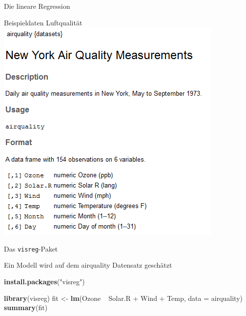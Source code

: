 \documentclass[ignorenonframetext,]{beamer}
\newenvironment{Shaded}{}{}
\newcommand{\KeywordTok}[1]{\textcolor[rgb]{0.00,0.44,0.13}{\textbf{{#1}}}}
\newcommand{\DataTypeTok}[1]{\textcolor[rgb]{0.56,0.13,0.00}{{#1}}}
\newcommand{\StringTok}[1]{\textcolor[rgb]{0.25,0.44,0.63}{{#1}}}
\newcommand{\NormalTok}[1]{{#1}}
\begin{document}
\begin{frame}[fragile]{Die lineare Regression}
\begin{block}{Beispieldaten Luftqualität}
\includegraphics{./tex2pdf.9796/9d1d4578d8325405517057b022c0b78c64a2489e.png}

\end{block}

\begin{block}{Das \texttt{visreg}-Paket}

Ein Modell wird auf dem airquality Datensatz geschätzt

\begin{Shaded}
\begin{Highlighting}[]
\KeywordTok{install.packages}\NormalTok{(}\StringTok{"visreg"}\NormalTok{)}
\end{Highlighting}
\end{Shaded}

\begin{Shaded}
\begin{Highlighting}[]
\KeywordTok{library}\NormalTok{(visreg)}
\NormalTok{fit <-}\StringTok{ }\KeywordTok{lm}\NormalTok{(Ozone ~}\StringTok{ }\NormalTok{Solar.R +}\StringTok{ }\NormalTok{Wind +}\StringTok{ }\NormalTok{Temp, }\DataTypeTok{data =} \NormalTok{airquality)}
\KeywordTok{summary}\NormalTok{(fit)}
\end{Highlighting}
\end{Shaded}


\end{block}
\end{frame}
\end{document}
